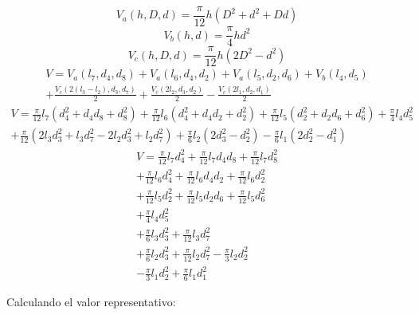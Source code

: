\documentclass[letter,11pt]{article}
\begin{document}
\begin{equation}
    V_a(h,D,d) = \frac{\pi}{12} h (D^2+d^2+Dd)
\tag{cono truncado}
\end{equation}
\begin{equation}
    V_b(h,d) = \frac{\pi}{4} h d^2
\tag{cilindro}
\end{equation}
\begin{equation}
    V_c(h,D,d) = \frac{\pi}{12} h (2D^2-d^2)
\tag{tonel}
\end{equation}
\begin{equation*}
\begin{split}
    V=V_a(l_7,d_4,d_8)+V_a(l_6,d_4,d_2)+V_a(l_5,d_2,d_6)+V_b(l_4,d_5) \\
    +\frac{V_c(2(l_3-l_2),d_3,d_7)}{2}
    +\frac{V_c(2 l_2,d_3,d_2)}{2}
    -\frac{V_c(2 l_1,d_2,d_1)}{2}
\end{split}
\end{equation*}
\begin{equation*}
\begin{split}
    V=\frac{\pi}{12}l_7(d_4^2+d_4 d_8+d_8^2)
     +\frac{\pi}{12}l_6(d_4^2+d_4 d_2+d_2^2)
     +\frac{\pi}{12}l_5(d_2^2+d_2 d_6+d_6^2)
     +\frac{\pi}{4}l_4 d_5^2 \\
     +\frac{\pi}{12}(2l_3 d_3^2+l_3 d_7^2-2 l_2 d_3^2+l_2 d_7^2)
     +\frac{\pi}{6}l_2(2d_3^2-d_2^2)
     -\frac{\pi}{6}l_1(2d_2^2-d_1^2)
\end{split}
\end{equation*}
\begin{equation}
\begin{split}
    V=\frac{\pi}{12}l_7 d_4^2+\frac{\pi}{12}l_7 d_4 d_8
     +\frac{\pi}{12}l_7 d_8^2 \\
     +\frac{\pi}{12}l_6 d_4^2+\frac{\pi}{12}l_6 d_4 d_2
     +\frac{\pi}{12}l_6 d_2^2 \\
     +\frac{\pi}{12}l_5 d_2^2+\frac{\pi}{12}l_5 d_2 d_6
     +\frac{\pi}{12}l_5 d_6^2 \\
     +\frac{\pi}{4}l_4 d_5^2 \\
     +\frac{\pi}{6}l_3 d_3^2+\frac{\pi}{12}l_3 d_7^2 \\
     +\frac{\pi}{6}l_2 d_3^2+\frac{\pi}{12}l_2 d_7^2-\frac{\pi}{3}l_2 d_2^2 \\
     -\frac{\pi}{3}l_1 d_2^2+\frac{\pi}{6}l_1 d_1^2
\end{split}
\end{equation}

Calculando el valor representativo:
\end{document}
